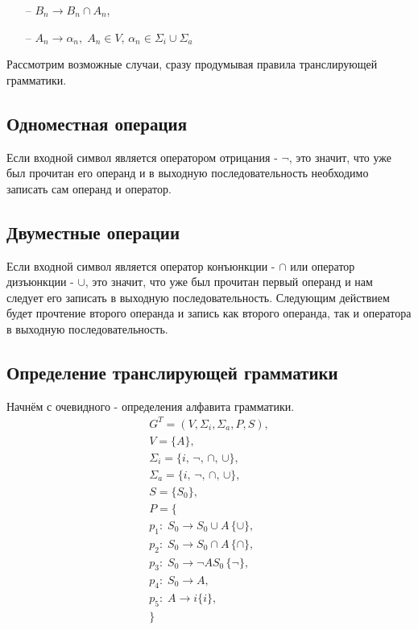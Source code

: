 \documentclass[12pt]{extarticle}
\begin{document}
\begin{sloppypar}
\begin{itemize}
		\item[--] $B_n \rightarrow B_n \cap A_n$,
		\item[--] $A_n \rightarrow \alpha_n, \; A_n \in V, \, \alpha_n \in \Sigma_i \cup \Sigma_a$ 	
	\end{itemize}
	
	Рассмотрим возможные случаи, сразу продумывая правила транслирующей грамматики.
	
	\subsection{Одноместная операция}
	
	Если входной символ является оператором отрицания - $\neg$, это значит, что уже был прочитан его операнд и в выходную последовательность необходимо записать сам операнд и оператор.
	
	 \subsection{Двуместные операции}
	 
	 Если входной символ является оператор конъюнкции - $\cap$ или оператор дизъюнкции - $\cup$, это значит, что уже был прочитан первый операнд и нам следует его записать в выходную последовательность. Следующим действием будет прочтение второго операнда и запись как второго операнда, так и оператора в выходную последовательность.
	 
	 \subsection{Определение транслирующей грамматики}
	 
	 Начнём с очевидного - определения алфавита грамматики.
	 \begin{gather*}
	 	G^T = (V, \Sigma_i, \Sigma_a, P, S), \\
	 	V = \{A\}, \\
	 	\Sigma_i = \{i, \, \neg, \, \cap, \, \cup\}, \\
	 	\Sigma_a = \{i, \, \neg, \, \cap, \, \cup\}, \\
	 	S = \{S_0\}, \\
	 	P = \{ \\
	 	p_1 :\; S_0 \rightarrow S_0 \cup A \, \{ \cup \}, \\
	 	p_2 :\; S_0 \rightarrow S_0 \cap A \, \{ \cap \}, \\
	 	p_3 :\; S_0 \rightarrow \neg A S_0 \, \{ \neg \}, \\
	 	p_4 :\; S_0 \rightarrow A, \\
	 	p_5 :\; A \rightarrow i \{ i \}, \\
	 	\}
	 \end{gather*}
		

\end{sloppypar}
\end{document}
